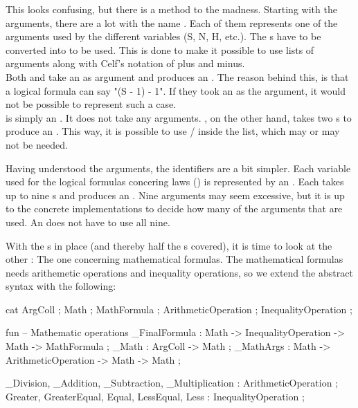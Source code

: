 This looks confusing, but there is a method to the madness. Starting with the arguments, there are a lot with the name . Each of them represents one of the arguments used by the different variables (S, N, H, etc.). The s have to be converted into  to be used. This is done to make it possible to use lists of arguments along with Celf's notation of plus and minus. \\
Both  and  take an  as argument and produces an . The reason behind this, is that a logical formula can say "(S - 1) - 1". If they took an  as the argument, it would not be possible to represent such a case.\\
 is simply an . It does not take any arguments. , on the other hand, takes two s to produce an . This way, it is possible to use / inside the list, which may or may not be needed.

Having understood the arguments, the identifiers are a bit simpler. Each variable used for the logical formulas concering laws () is represented by an . Each  takes up to nine s and produces an . Nine arguments may seem excessive, but it is up to the concrete implementations to decide how many of the arguments that are used. An  does not have to use all nine. 

With the s in place (and thereby half the s covered),  it is time to look at the other : The one concerning mathematical formulas. The mathematical formulas needs arithemetic operations and inequality operations, so we extend the abstract syntax with the following:

\begin{lstgf}
    cat
        ArgColl ; Math ; MathFormula ; ArithmeticOperation ; InequalityOperation ;

    fun
        -- Mathematic operations
        _FinalFormula : Math -> InequalityOperation -> Math -> MathFormula ;
        _Math : ArgColl -> Math ;
        _MathArgs : Math -> ArithmeticOperation -> Math -> Math ;

        _Division, _Addition, _Subtraction, _Multiplication : ArithmeticOperation ;
        Greater, GreaterEqual, Equal, LessEqual, Less : InequalityOperation ;
\end{lstgf}

